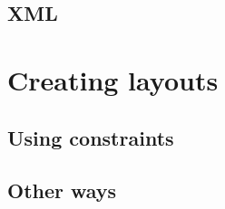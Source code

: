    \subsection{\mxp XML}


  \section{Creating layouts}


   \subsection{Using constraints}


   \subsection{Other ways}


